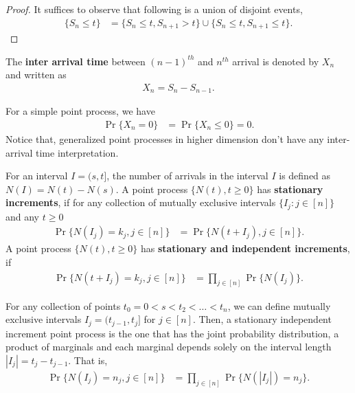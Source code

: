 \documentclass[a4paper,10pt,english]{article}
\begin{document}
\begin{proof} It suffices to observe that following is a union of disjoint events,
\begin{align*}
\{S_n \leqslant t \} &= \{S_n \leqslant t, S_{n+1} > t\} \cup \{S_{n} \leqslant t, S_{n+1} \leqslant t\}.
\end{align*}
\end{proof}
The \textbf{inter arrival time} between $(n-1)^{th}$ and $n^{th}$ arrival is denoted by $X_n$ and written as
\begin{align*}
X_n = S_n - S_{n-1}.
\end{align*}
\begin{rem} For a simple point process, we have
\begin{align*}
\Pr\{X_{n} = 0\} &= \Pr\{X_n\leqslant 0\} = 0.
\end{align*}
Notice that, generalized point processes in higher dimension don't have any inter-arrival time interpretation. 
\end{rem}
For an interval $I = (s,t]$, the number of arrivals in the interval $I$ is defined as $N(I) = N(t) - N(s)$. 
A point process $\{N(t), t\geqslant 0\}$ has \textbf{stationary increments}, 
if for any collection of mutually exclusive intervals $\{I_j: j \in [n]\}$ and any $t \geqslant 0$ 
\begin{align*}
\Pr\{N(I_j) = k_j, j \in [n]\} &= \Pr\{N(t + I_j), j \in [n]\}.
\end{align*}
A point process $\{N(t), t\geqslant 0\}$ has \textbf{stationary  and independent increments}, if 
\begin{align*}
\Pr\{N(t+I_j) = k_j, j \in [n]\} &= \prod_{j \in [n]}\Pr\{N(I_j)\}.
\end{align*}

\begin{rem}
For any collection of points  $t_0 = 0 < s<t_{2} < \ldots < t_{n}$, 
we can define mutually exclusive intervals $I_j = (t_{j-1}, t_j]$ for $j \in [n]$. 
Then, a stationary independent increment point process is the one that has the joint probability distribution, a product of marginals and each marginal depends solely on the interval length $|I_j| = t_j - t_{j-1}$. 
That is, 
\begin{align*}
\Pr\{N(I_j) = n_j,{j \in [n]}\} &= \prod_{j \in [n]}\Pr\{N(|I_j|) = n_j\}.
\end{align*} 
\end{rem}
\end{document}
